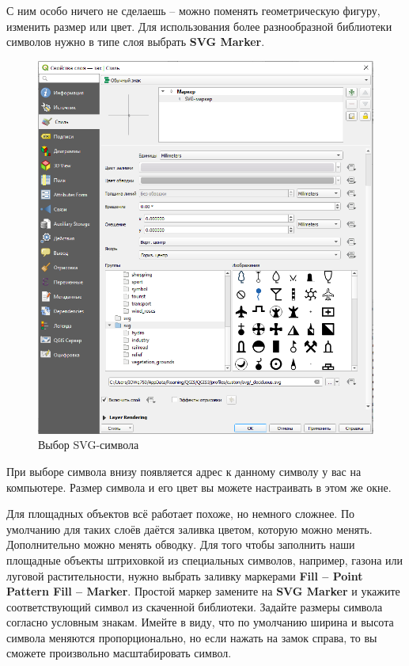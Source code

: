 \documentclass[
  12pt,
]{book}
\begin{document}
С ним особо ничего не сделаешь -- можно поменять геометрическую фигуру, изменить размер или цвет. Для использования более разнообразной библиотеки символов нужно в типе слоя выбрать \textbf{SVG Marker}.

\begin{figure}
\centering
\includegraphics{images/Practice/Svg_selection.png}
\caption{Выбор SVG-символа}
\end{figure}

При выборе символа внизу появляется адрес к данному символу у вас на компьютере. Размер символа и его цвет вы можете настраивать в этом же окне.

Для площадных объектов всё работает похоже, но немного сложнее. По умолчанию для таких слоёв даётся заливка цветом, которую можно менять. Дополнительно можно менять обводку. Для того чтобы заполнить наши площадные объекты штриховкой из специальных символов, например, газона или луговой растительности, нужно выбрать заливку маркерами \textbf{Fill -- Point Pattern Fill -- Marker}. Простой маркер замените на \textbf{SVG Marker} и укажите соответствующий символ из скаченной библиотеки. Задайте размеры символа согласно условным знакам. Имейте в виду, что по умолчанию ширина и высота символа меняются пропорционально, но если нажать на замок справа, то вы сможете произвольно масштабировать символ.
\end{document}
